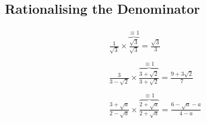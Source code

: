 \documentclass{article}
\begin{document}
\subsection{Rationalising the Denominator}

\begin{gather*}
	\frac{1}{\sqrt{3}} \times \overbrace{\frac{\sqrt{3}}{\sqrt{3}}}^{\equiv 1} = \frac{\sqrt{3}}{3}\\
	\\
	\frac{3}{3 - \sqrt{2}} \times \overbrace{\frac{3 + \sqrt{2}}{3 + \sqrt{2}}}^{\equiv 1} = \frac{9 + 3\sqrt{2}}{7}\\
	\\
	\frac{3 + \sqrt{a}}{2 - \sqrt{a}} \times \overbrace{\frac{2 + \sqrt{a}}{2 + \sqrt{a}}}^{\equiv 1} = \frac{6 - \sqrt{a} - a}{4 - a}\\
	\\
\end{gather*}

\enddocument
\end{document}
